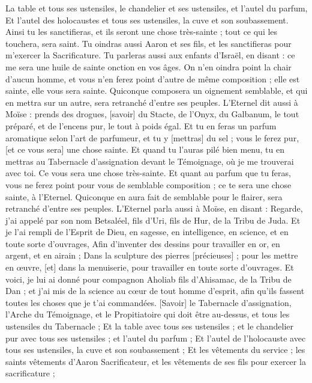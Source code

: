 \begin{multicols}{2}
La table et tous ses ustensiles, le chandelier et ses ustensiles, et l'autel du parfum,
Et l'autel des holocaustes et tous ses ustensiles, la cuve et son soubassement.
Ainsi tu les sanctifieras, et ils seront une chose très-sainte ; tout ce qui les touchera, sera saint.
Tu oindras aussi Aaron et ses fils, et les sanctifieras pour m'exercer la Sacrificature.
Tu parleras aussi aux enfants d'Israël, en disant : ce me sera une huile de sainte onction en vos âges.
On n'en oindra point la chair d'aucun homme, et vous n'en ferez point d'autre de même composition ; elle est sainte, elle vous sera sainte.
Quiconque composera un oignement semblable, et qui en mettra sur un autre, sera retranché d'entre ses peuples.
L'Eternel dit aussi à Moïse : prends des drogues, [savoir] du Stacte, de l'Onyx, du Galbanum, le tout préparé, et de l'encens pur, le tout à poids égal.
Et tu en feras un parfum aromatique selon l'art de parfumeur, et tu y [mettras] du sel ; vous le ferez pur, [et ce vous sera] une chose sainte.
Et quand tu l'auras pilé bien menu, tu en mettras au Tabernacle d'assignation devant le Témoignage, où je me trouverai avec toi. Ce vous sera une chose très-sainte.
Et quant au parfum que tu feras, vous ne ferez point pour vous de semblable composition ; ce te sera une chose sainte, à l'Eternel.
Quiconque en aura fait de semblable pour le flairer, sera retranché d'entre ses peuples.
\VerseOne{}L'Eternel parla aussi à Moïse, en disant :
Regarde, j'ai appelé par son nom Betsaléel, fils d'Uri, fils de Hur, de la Tribu de Juda.
Et je l'ai rempli de l'Esprit de Dieu, en sagesse, en intelligence, en science, et en toute sorte d'ouvrages,
Afin d'inventer des dessins pour travailler en or, en argent, et en airain ;
Dans la sculpture des pierres [précieuses] ; pour les mettre en œuvre, [et] dans la menuiserie, pour travailler en toute sorte d'ouvrages.
Et voici, je lui ai donné pour compagnon Aholiab fils d'Ahisamac, de la Tribu de Dan ; et j'ai mis de la science au cœur de tout homme d'esprit, afin qu'ils fassent toutes les choses que je t'ai commandées.
[Savoir] le Tabernacle d'assignation, l'Arche du Témoignage, et le Propitiatoire qui doit être au-dessus, et tous les ustensiles du Tabernacle ;
Et la table avec tous ses ustensiles ; et le chandelier pur avec tous ses ustensiles ; et l'autel du parfum ;
Et l'autel de l'holocauste avec tous ses ustensiles, la cuve et son soubassement ;
Et les vêtements du service ; les saints vêtements d'Aaron Sacrificateur, et les vêtements de ses fils pour exercer la sacrificature ;

\end{multicols}
